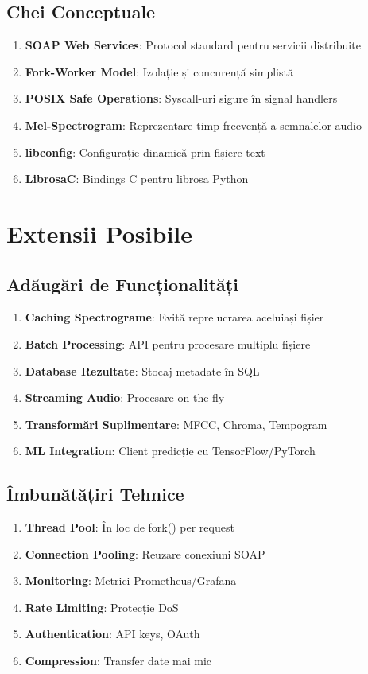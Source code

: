 \documentclass[12pt,a4paper,oneside]{book}
\begin{document}
\subsection{Chei Conceptuale}

\begin{enumerate}
    \item \textbf{SOAP Web Services}: Protocol standard pentru servicii distribuite
    \item \textbf{Fork-Worker Model}: Izolație și concurență simplistă
    \item \textbf{POSIX Safe Operations}: Syscall-uri sigure în signal handlers
    \item \textbf{Mel-Spectrogram}: Reprezentare timp-frecvență a semnalelor audio
    \item \textbf{libconfig}: Configurație dinamică prin fișiere text
    \item \textbf{LibrosaC}: Bindings C pentru librosa Python
\end{enumerate}

\section{Extensii Posibile}

\subsection{Adăugări de Funcționalități}

\begin{enumerate}
    \item \textbf{Caching Spectrograme}: Evită reprelucrarea aceluiași fișier
    \item \textbf{Batch Processing}: API pentru procesare multiplu fișiere
    \item \textbf{Database Rezultate}: Stocaj metadate în SQL
    \item \textbf{Streaming Audio}: Procesare on-the-fly
    \item \textbf{Transformări Suplimentare}: MFCC, Chroma, Tempogram
    \item \textbf{ML Integration}: Client predicție cu TensorFlow/PyTorch
\end{enumerate}

\subsection{Îmbunătățiri Tehnice}

\begin{enumerate}
    \item \textbf{Thread Pool}: În loc de fork() per request
    \item \textbf{Connection Pooling}: Reuzare conexiuni SOAP
    \item \textbf{Monitoring}: Metrici Prometheus/Grafana
    \item \textbf{Rate Limiting}: Protecție DoS
    \item \textbf{Authentication}: API keys, OAuth
    \item \textbf{Compression}: Transfer date mai mic
\end{enumerate}
\end{document}
